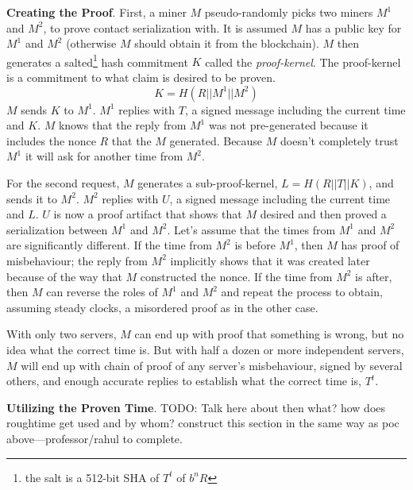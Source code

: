 \documentclass[letterpaper,11pt]{article}
\newcommand{\todo}[1]{}
\renewcommand{\todo}[1]{{\color{red} TODO: {#1}}}
\begin{document}
\textbf{Creating the Proof}. First, a miner $\mathit{M}$ pseudo-randomly picks two miners $\mathit{M^1}$ and $\mathit{M^2}$, to prove contact serialization with. It is assumed $\mathit{M}$ has a public key for $\mathit{M^1}$ and $\mathit{M^2}$ (otherwise $\mathit{M}$ should obtain it from the blockchain). $\mathit{M}$ then generates a salted\footnote{the salt is a 512-bit SHA of $\mathit{T^t}$ of $\mathit{b^nR}$} hash commitment $\mathit{K}$ called the \emph{proof-kernel}. The proof-kernel is a commitment to what claim is desired to be proven. \[\mathit{K = H\left(R || M^1 || M^2\right)}\] $\mathit{M}$ sends $\mathit{K}$ to $\mathit{M^1}$. $\mathit{M^1}$ replies with $\mathit{T}$, a signed message including the current time and $\mathit{K}$. $\mathit{M}$ knows that the reply from $\mathit{M^1}$ was not pre-generated because it includes the nonce $R$ that the $\mathit{M}$ generated. Because $\mathit{M}$ doesn't completely trust $\mathit{M^1}$ it will ask for another time from $\mathit{M^2}$.\newline

For the second request, $\mathit{M}$ generates a sub-proof-kernel, $\mathit{L} = \mathit{H}(R || \mathit{T} || \mathit{K})$, and sends it to $\mathit{M^2}$. $\mathit{M^2}$ replies with $\mathit{U}$, a signed message including the current time and $\mathit{L}$. $\mathit{U}$ is now a proof artifact that shows that $\mathit{M}$ desired and then proved a serialization between $\mathit{M^1}$ and $\mathit{M^2}$. Let's assume that the times from $\mathit{M^1}$ and $\mathit{M^2}$ are significantly different. If the time from $\mathit{M^2}$ is before $\mathit{M^1}$, then $\mathit{M}$ has proof of misbehaviour; the reply from $\mathit{M^2}$ implicitly shows that it was created later because of the way that $\mathit{M}$ constructed the nonce. If the time from $\mathit{M^2}$ is after, then $\mathit{M}$ can reverse the roles of $\mathit{M^1}$ and $\mathit{M^2}$ and repeat the process to obtain, assuming steady clocks, a misordered proof as in the other case.\newline

With only two servers, $\mathit{M}$ can end up with proof that something is wrong, but no idea what the correct time is. But with half a dozen or more independent servers, $\mathit{M}$ will end up with chain of proof of any server's misbehaviour, signed by several others, and enough accurate replies to establish what the correct time is, $\mathit{T^t}$.\newline

\textbf{Utilizing the Proven Time}. \todo{Talk here about then what? how does roughtime get used and by whom? construct this section in the same way as poc above---professor/rahul to complete.}
\end{document}
